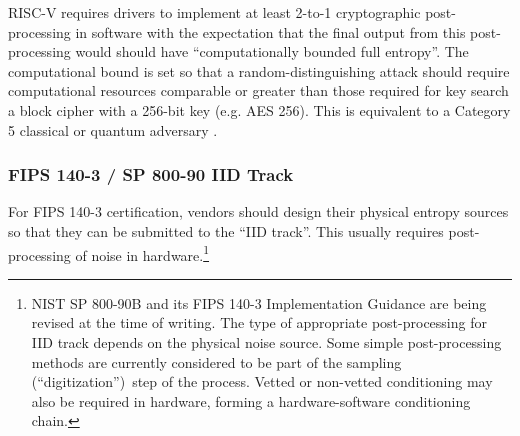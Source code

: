     RISC-V requires drivers to implement at least 2-to-1 cryptographic
    post-processing in software with the expectation that the final output
    from this post-processing would should have ``computationally bounded
    full entropy''.  The computational bound is set so that a
    random-distinguishing attack should require computational resources
    comparable or greater than those required for key search a block cipher
    with a 256-bit key (e.g. AES 256). This is equivalent to a Category 5
    classical or quantum adversary
    \cite[Section 4.A.4 Security Strength Categories]{NI16}.

    \subsubsection{FIPS 140-3 / SP 800-90 IID Track}

    For FIPS 140-3 certification, vendors should design their physical entropy
    sources so that they can be submitted to the  ``IID track''. This usually
    requires post-processing of noise in hardware.\footnote{NIST SP 800-90B
        \cite{TuBaKe+18} and its  FIPS 140-3 Implementation Guidance
        \cite[Section D.K.]{NICC20} are being revised at the time of writing.
        The type of appropriate post-processing for IID track depends on
        the physical noise source. Some simple post-processing methods are
        currently considered to be part of the sampling (``digitization'')\
        step of the process. Vetted or non-vetted conditioning may also be
        required in hardware, forming a hardware-software conditioning chain.}

